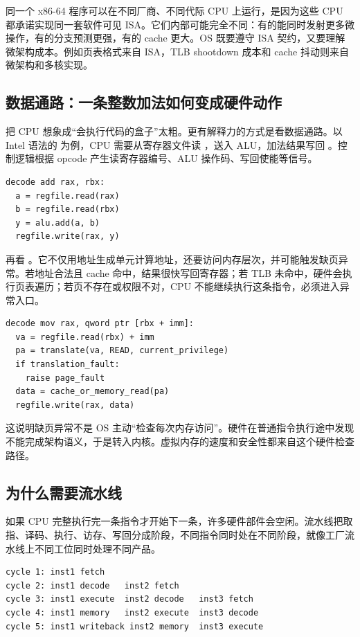 同一个 x86-64 程序可以在不同厂商、不同代际 CPU 上运行，是因为这些 CPU 都承诺实现同一套软件可见 ISA。它们内部可能完全不同：有的能同时发射更多微操作，有的分支预测更强，有的 cache 更大。OS 既要遵守 ISA 契约，又要理解微架构成本。例如页表格式来自 ISA，TLB shootdown 成本和 cache 抖动则来自微架构和多核实现。

\subsection{数据通路：一条整数加法如何变成硬件动作}

把 CPU 想象成“会执行代码的盒子”太粗。更有解释力的方式是看数据通路。以 Intel 语法的  为例，CPU 需要从寄存器文件读 ，送入 ALU，加法结果写回 。控制逻辑根据 opcode 产生读寄存器编号、ALU 操作码、写回使能等信号。

\begin{lstlisting}
decode add rax, rbx:
  a = regfile.read(rax)
  b = regfile.read(rbx)
  y = alu.add(a, b)
  regfile.write(rax, y)
\end{lstlisting}

再看 。它不仅用地址生成单元计算地址，还要访问内存层次，并可能触发缺页异常。若地址合法且 cache 命中，结果很快写回寄存器；若 TLB 未命中，硬件会执行页表遍历；若页不存在或权限不对，CPU 不能继续执行这条指令，必须进入异常入口。

\begin{lstlisting}
decode mov rax, qword ptr [rbx + imm]:
  va = regfile.read(rbx) + imm
  pa = translate(va, READ, current_privilege)
  if translation_fault:
    raise page_fault
  data = cache_or_memory_read(pa)
  regfile.write(rax, data)
\end{lstlisting}

这说明缺页异常不是 OS 主动“检查每次内存访问”。硬件在普通指令执行途中发现不能完成架构语义，于是转入内核。虚拟内存的速度和安全性都来自这个硬件检查路径。

\subsection{为什么需要流水线}

如果 CPU 完整执行完一条指令才开始下一条，许多硬件部件会空闲。流水线把取指、译码、执行、访存、写回分成阶段，不同指令同时处在不同阶段，就像工厂流水线上不同工位同时处理不同产品。

\begin{lstlisting}
cycle 1: inst1 fetch
cycle 2: inst1 decode   inst2 fetch
cycle 3: inst1 execute  inst2 decode   inst3 fetch
cycle 4: inst1 memory   inst2 execute  inst3 decode
cycle 5: inst1 writeback inst2 memory  inst3 execute
\end{lstlisting}

